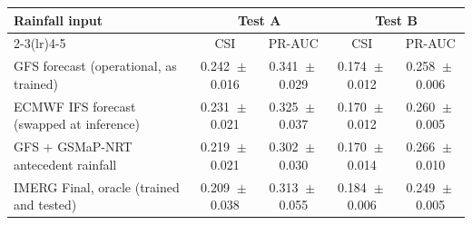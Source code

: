 \begin{tabular}{lcccc}
\toprule
Rainfall input & \multicolumn{2}{c}{Test A} & \multicolumn{2}{c}{Test B} \\
\cmidrule(lr){2-3}\cmidrule(lr){4-5}
 & CSI & PR-AUC & CSI & PR-AUC \\
\midrule
GFS forecast (operational, as trained)
& 0.242%
${}\pm{}$0.016%
& 0.341%
${}\pm{}$0.029%
& 0.174%
${}\pm{}$0.012%
& 0.258%
${}\pm{}$0.006%
\\
ECMWF IFS forecast (swapped at inference)
& 0.231%
${}\pm{}$0.021%
& 0.325%
${}\pm{}$0.037%
& 0.170%
${}\pm{}$0.012%
& 0.260%
${}\pm{}$0.005%
\\
GFS + GSMaP-NRT antecedent rainfall
& 0.219%
${}\pm{}$0.021%
& 0.302%
${}\pm{}$0.030%
& 0.170%
${}\pm{}$0.014%
& 0.266%
${}\pm{}$0.010%
\\
IMERG Final, oracle (trained and tested)
& 0.209%
${}\pm{}$0.038%
& 0.313%
${}\pm{}$0.055%
& 0.184%
${}\pm{}$0.006%
& 0.249%
${}\pm{}$0.005%
\\
\bottomrule
\end{tabular}
